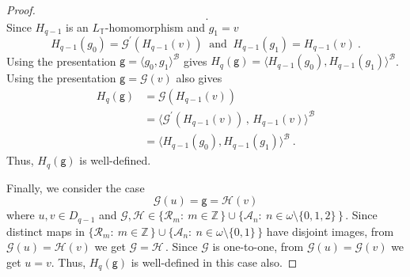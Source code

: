 \documentclass[10pt,a4paper, openany,  oldfontcommands]{memoir}
\newtheorem{open problem} [theorem] {Open Problem}
\newtheorem{open question} [theorem] {Open Question}
\begin{document}
\begin{proof}
\[   \     .    
   \]
 Since  $  H_{ q-1}  $     is  an  $  L_{  \mathbb{T}  }  $-homomorphism    and  $  g_1  =  v  $
 \[
   H_{q-1}  (g_0 )   =     \mathcal{G}^{  \prime  }    \left(    H_{ q-1} (v)  \right)   
   \     \mbox{  and   }    \   
   H_{ q-1 } (g_1)  =  H_{ q-1}  (v)  
   \       .
\]   
Using the presentation    $ \mathsf{g}   = \langle  g_0   ,      g_1   \rangle^{  \mathcal{B}  }      $  gives  
$  H_q  \left(  \mathsf{g}  \right)  =  \langle  H_{q-1}  (g_0 )   ,     H_{ q-1} ( g_1)   \rangle^{  \mathcal{B}  }   $. 
Using the presentation   $ \mathsf{g} =  \mathcal{G}   \left(  v  \right)   $  also  gives 
\begin{align*}
 H_q  \left(  \mathsf{g}  \right)   
 &= 
  \mathcal{G}   \left(    H_{ q-1} (v)  \right) 
  \\
  &=  
  \langle      \mathcal{G}^{  \prime  }    \left(    H_{ q-1} (v)  \right)   \,  ,  \,     H_{ q-1} (v)     \rangle^{  \mathcal{B}  }
  \\
  &=    \langle  H_{q-1}  (g_0 )   ,     H_{ q-1} ( g_1)   \rangle^{  \mathcal{B}  }  
  \       .
\end{align*}
Thus,  $  H_q  \left(  \mathsf{g}  \right)   $  is well-defined.  








Finally, we consider the case 
\[
   \mathcal{G}   \left(  u  \right)     =  \mathsf{g} =     \mathcal{H}   \left(  v  \right)   
\]
where    $  u,  v  \in  D_{ q-1}    $   and  
$  \mathcal{G} ,   \mathcal{H}  \in    \lbrace  \mathcal{R}_m   :  \   m  \in  \mathbb{Z} \,   \rbrace   \cup 
 \lbrace  \mathcal{A}_n :  \   n  \in    \omega  \setminus \lbrace 0, 1 ,  2   \rbrace  \,   \rbrace    \,    $. 
Since  distinct maps in 
$   \lbrace  \mathcal{R}_m   :  \   m  \in  \mathbb{Z} \,   \rbrace   \cup 
 \lbrace  \mathcal{A}_n :  \   n  \in    \omega  \setminus \lbrace 0, 1   \rbrace  \,   \rbrace    $  
 have disjoint images,  
 from    $   \mathcal{G}   \left(  u  \right)    =     \mathcal{H}   \left(  v  \right)     $   we get     $     \mathcal{G}   =     \mathcal{H}      \,  $. 
Since  $     \mathcal{G}    $  is one-to-one,  
from    $     \mathcal{G}   \left(  u  \right)   =     \mathcal{G}   \left(  v  \right)     $  we get  $  u  = v  $. 
Thus,   $  H_q  \left(  \mathsf{g}  \right)   $  is well-defined  in this case also.  

 








\end{proof}
\end{document}

